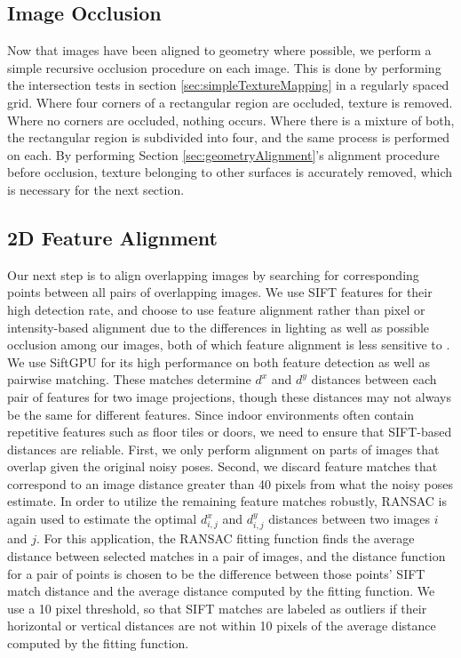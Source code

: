 \documentclass[]{spie}  %
\begin{document}
\subsection{Image Occlusion}
\label{sec:imageOcclusion}
Now that images have been aligned to geometry where possible, we
perform a simple recursive occlusion procedure on each image. This is
done by performing the intersection tests in section
\ref{sec:simpleTextureMapping} in a regularly spaced grid. Where four
corners of a rectangular region are occluded, texture is
removed. Where no corners are occluded, nothing occurs. Where there is
a mixture of both, the rectangular region is subdivided into four, and
the same process is performed on each. By performing Section
\ref{sec:geometryAlignment}'s alignment procedure before occlusion,
texture belonging to other surfaces is accurately removed, which is
necessary for the next section.

\subsection{2D Feature Alignment}
\label{sec:robustSIFTFeatureMatching}
Our next step is to align overlapping images by searching for
corresponding points between all pairs of overlapping images. We use
SIFT features for their high detection rate, and choose to use feature
alignment rather than pixel or intensity-based alignment due to the
differences in lighting as well as possible occlusion among our
images, both of which feature alignment is less sensitive to
\cite{lowe1999object, mikolajczyk2005performance, szeliski2006image}.
We use SiftGPU \cite{siftgpu} for its high performance on both feature
detection as well as pairwise matching. These matches determine $d^x$
and $d^y$ distances between each pair of features for two image
projections, though these distances may not always be the same for
different features. Since indoor environments often contain repetitive
features such as floor tiles or doors, we need to ensure that
SIFT-based distances are reliable. First, we only perform alignment on
parts of images that overlap given the original noisy poses. Second,
we discard feature matches that correspond to an image distance
greater than 40 pixels from what the noisy poses estimate. In order to
utilize the remaining feature matches robustly, RANSAC
\cite{fischler1981random} is again used to estimate the optimal
$d^x_{i,j}$ and $d^y_{i,j}$ distances between two images $i$ and
$j$. For this application, the RANSAC fitting function finds the
average distance between selected matches in a pair of images, and the
distance function for a pair of points is chosen to be the difference
between those points' SIFT match distance and the average distance
computed by the fitting function. We use a 10 pixel threshold, so that
SIFT matches are labeled as outliers if their horizontal or vertical
distances are not within 10 pixels of the average distance computed by
the fitting function.
\end{document}
